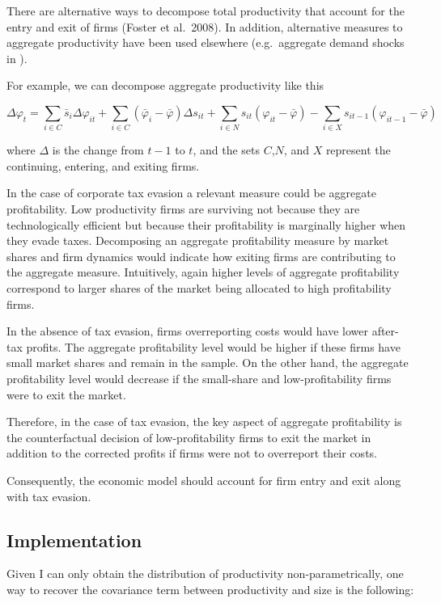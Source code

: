 \documentclass[
  12pt]{article}
\theoremstyle{definition}
\theoremstyle{remark}
\begin{document}
There are alternative ways to decompose total productivity that account
for the entry and exit of firms (Foster et al.~2008). In addition,
alternative measures to aggregate productivity have been used elsewhere
(e.g.~aggregate demand shocks in \citet{Eslava2004}).

For example, we can decompose aggregate productivity like this

\[
\Delta\varphi_t = \sum_{i \in C}\bar s_i \Delta\varphi_{it} + \sum_{i\in C}(\bar\varphi_i-\bar\varphi)\Delta s_{it}+\sum_{i\in N} s_{it}\left(\varphi_{it}-\bar\varphi\right)-\sum_{i\in X}s_{it-1}\left(\varphi_{it-1}-\bar \varphi\right)
\]

where \(\Delta\) is the change from \(t-1\) to \(t\), and the sets
\(C\),\(N\), and \(X\) represent the continuing, entering, and exiting
firms.

In the case of corporate tax evasion a relevant measure could be
aggregate profitability. Low productivity firms are surviving not
because they are technologically efficient but because their
profitability is marginally higher when they evade taxes. Decomposing an
aggregate profitability measure by market shares and firm dynamics would
indicate how exiting firms are contributing to the aggregate measure.
Intuitively, again higher levels of aggregate profitability correspond
to larger shares of the market being allocated to high profitability
firms.

In the absence of tax evasion, firms overreporting costs would have
lower after-tax profits. The aggregate profitability level would be
higher if these firms have small market shares and remain in the sample.
On the other hand, the aggregate profitability level would decrease if
the small-share and low-profitability firms were to exit the market.

Therefore, in the case of tax evasion, the key aspect of aggregate
profitability is the counterfactual decision of low-profitability firms
to exit the market in addition to the corrected profits if firms were
not to overreport their costs.

Consequently, the economic model should account for firm entry and exit
along with tax evasion.

\subsection{Implementation}\label{implementation-1}

Given I can only obtain the distribution of productivity
non-parametrically, one way to recover the covariance term between
productivity and size is the following:
\end{document}
